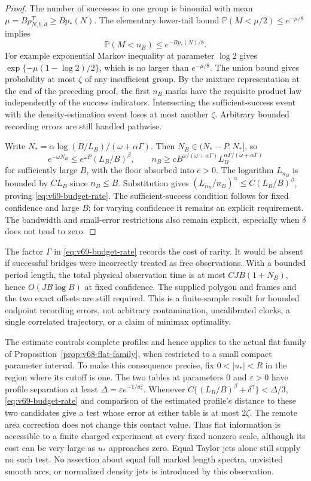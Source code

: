 \begin{proof}
The number of successes in one group is binomial with mean
$\mu=Bp^T_{N,b,d}\ge Bp_*(N)$.  The elementary lower-tail bound
$\mathbb P(M<\mu/2)\le e^{-\mu/8}$ implies
\[
 \mathbb P(M<n_B)\le e^{-Bp_*(N)/8}.
\]
For example exponential Markov inequality at parameter $\log2$ gives
$\exp\{-\mu(1-\log2)/2\}$, which is no larger than $e^{-\mu/8}$.
The union bound gives probability at most $\zeta$ of any insufficient
group.  By the mixture representation at the end of the preceding proof,
the first $n_B$ marks have the requisite product law independently of
the success indicators.  Intersecting the sufficient-success event
with the density-estimation event loses at most another $\zeta$.
Arbitrary bounded recording errors are still handled pathwise.

Write $N_*=\alpha\log(B/L_B)/(\omega+\alpha\Gamma)$.
Then $N_B\in(N_*-P,N_*]$, so
\[
 e^{-\omega N_B}\le e^{\omega P}(L_B/B)^\beta,\qquad
 n_B\ge c B^{\omega/(\omega+\alpha\Gamma)}
                   L_B^{\alpha\Gamma/(\omega+\alpha\Gamma)}
\]
for sufficiently large $B$, with the floor absorbed into $c>0$.
The logarithm $L_{n_B}$ is bounded by $CL_B$ since $n_B\le B$.
Substitution gives
$(L_{n_B}/n_B)^\alpha\le C(L_B/B)^\beta$, proving
\eqref{eq:v69-budget-rate}.  The sufficient-success condition follows
for fixed confidence and large $B$; for varying confidence it remains
an explicit requirement.  The bandwidth and small-error restrictions
also remain explicit, especially when $\delta$ does not tend to zero.
\end{proof}

The factor $\Gamma$ in \eqref{eq:v69-budget-rate} records the cost of
rarity.  It would be absent if successful bridges were incorrectly treated
as free observations.  With a bounded period length, the total physical
observation time is at most $CJB(1+N_B)$, hence $O(JB\log B)$ at fixed
confidence.  The supplied polygon and frames and the two exact offsets
are still required.  This is a finite-sample result for bounded endpoint
recording errors, not arbitrary contamination, uncalibrated clocks,
a single correlated trajectory, or a claim of minimax optimality.

The estimate controls complete profiles and hence applies to the actual
flat family of Proposition~\ref{prop:v68-flat-family}, when restricted
to a small compact parameter interval.  To make this consequence precise,
fix $0<|u_*|<R$ in the region where its cutoff is one.  The two tables
at parameters $0$ and $\varepsilon>0$ have profile separation at least
$\Delta=\varepsilon e^{-1/u_*^2}$.  Whenever
$C\{(L_B/B)^\beta+\delta^\gamma\}<\Delta/3$,
\eqref{eq:v69-budget-rate} and comparison of the estimated profile's
distance to these two candidates give a test whose error at either table
is at most $2\zeta$.  The remote area correction
does not change this contact value.  Thus flat information is accessible
to a finite charged experiment at every fixed nonzero scale, although
its cost can be very large as $u_*$ approaches zero.  Equal Taylor jets
alone still supply no such test.  No assertion about equal full marked
length spectra, unvisited smooth arcs, or normalized density jets is
introduced by this observation.
